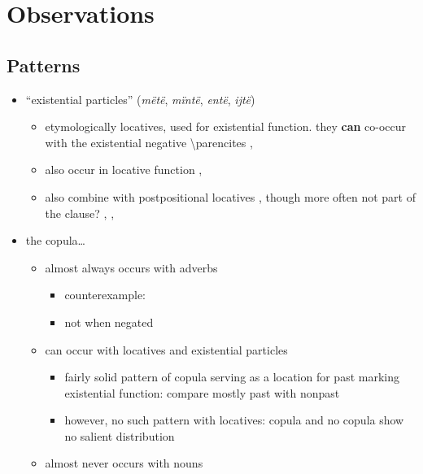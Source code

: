 \documentclass{memoir}
\begin{document}
\section{Observations}

\subsection{Patterns}

\begin{itemize}
\tightlist
\item
  ``existential particles'' (\emph{mëtë}, \emph{mïntë}, \emph{entë},
  \emph{ijtë})

  \begin{itemize}
  \tightlist
  \item
    etymologically locatives, used for existential function. they
    \textbf{can} co-occur with the existential negative 
    \textbackslash parencites
    ,
  \item
    also occur in locative function
    ,
  \item
    also combine with postpositional locatives ,
    though more often not part of the clause?
    , ,
  \end{itemize}
\item
  the copula\ldots{}

  \begin{itemize}
  \tightlist
  \item
    almost always occurs with adverbs

    \begin{itemize}
    \tightlist
    \item
      counterexample: 
    \item
      not when negated 
    \end{itemize}
  \item
    can occur with locatives and existential particles

    \begin{itemize}
    \tightlist
    \item
      fairly solid pattern of copula serving as a location for past
      marking existential function: compare mostly past
       with nonpast
    \item
      however, no such pattern with locatives: copula
       and no copula
       show no salient distribution
    \end{itemize}
  \item
    almost never occurs with nouns


\end{itemize}
\end{itemize}
\end{document}
